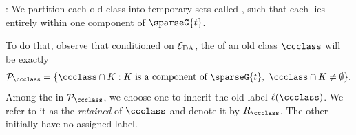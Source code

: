 \noindent{}:
We partition each old class into temporary sets called \emph{}, such that each \piece{} lies entirely within one component of $ \sparseG{t} $.

To do that, observe that conditioned on $ \mathcal{E}_{\rm DA} $, the  of an old class $ \ccclass $ will be exactly
\begin{align}
    \mathcal P_{\ccclass}
    =\{\ccclass\cap K:K\text{ is a component of }\sparseG{t},\ \ccclass\cap K\ne\emptyset\}. \nonumber
\end{align}
Among the  in $ \mathcal P_{\ccclass} $, we choose one to inherit the old label $ \complabel(\ccclass) $.
We refer to it as the \emph{retained \piece{}} of $ \ccclass $ and denote it by $ \retainedPiece{\ccclass} $.
The other  initially have no assigned label.

